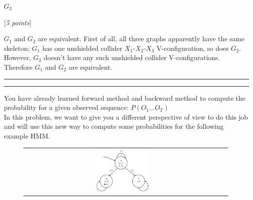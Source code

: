 \documentclass[11pt]{article}
\newcounter{marks}
\def\maxmarks#1{\extramark{#1}\addtocounter{marks}{#1}}
\def\extramark#1{\hfill
  [\emph{#1 points}]
}
\newcommand{\myfirstta}{Kuo Liu}
\newcommand{\question}[2] {\vspace{.25in} \hrule\vspace{0.5em} \noindent{\bf #1: #2} \vspace{0.5em} \hrule \vspace{.10in}}
\begin{document}
    $G_3$

\begin{center}
\end{center}


\maxmarks{5} \vspace{0 cm}

{\color{blue} $G_1$ and $G_2$ are equivalent. First of all, all three graphs
apparently have the same skeleton; $G_1$ has one unshielded collider $X_1$-$X_2$-$X_3$
V-configuration, so does $G_2$. However, $G_3$ doesn't have any such unshielded
collider V-configurations. Therefore $G_1$ and $G_2$ are equivalent. }



\clearpage

\question{3} {HMM I  (TA:- \myfirstta)}
You have already learned forward method and backward method to compute the probability for a given observed sequence: $P(O_1 ... O_T)$\\
In this problem, we want to give you a different perspective of view to do this job and will use this new way to compute some probabilities for the following example HMM.
\begin{figure}[h]
\centering
\begin{tabular}{cc}
\includegraphics[width = 0.28\textwidth]{q3.jpg}& 
\end{tabular}\label{fig:GNB}
\end{figure}
\end{document}
